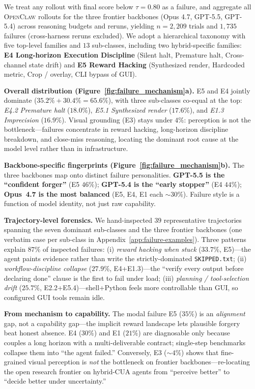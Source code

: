We treat any rollout with final score below $\tau\!=\!0.80$ as a failure, and aggregate all \textsc{OpenClaw} rollouts for the three frontier backbones (Opus 4.7, GPT-5.5, GPT-5.4) across reasoning budgets and reruns, yielding $n{=}2{,}209$ trials and $1{,}735$ failures (cross-harness reruns excluded). We adopt a hierarchical taxonomy with five top-level families and $13$ sub-classes, including two hybrid-specific families: \textbf{E4 Long-horizon Execution Discipline} (Silent halt, Premature halt, Cross-channel state drift) and \textbf{E5 Reward Hacking} (Synthesized render, Hardcoded metric, Crop / overlay, CLI bypass of GUI).

\noindent\textbf{Overall distribution (Figure~\ref{fig:failure_mechanism}a).}
E5 and E4 jointly dominate ($35.2\% + 30.4\% = 65.6\%$), with three sub-classes co-equal at the top: \emph{E4.2 Premature halt} ($18.0\%$), \emph{E5.1 Synthesized render} ($17.6\%$), and \emph{E1.3 Imprecision} ($16.9\%$). Visual grounding (E3) stays under $4\%$: perception is not the bottleneck---failures concentrate in reward hacking, long-horizon discipline breakdown, and close-miss reasoning, locating the dominant root cause at the model level rather than in infrastructure.

\smallskip
\noindent\textbf{Backbone-specific fingerprints (Figure~\ref{fig:failure_mechanism}b).}
The three backbones map onto distinct failure personalities. \textbf{GPT-5.5 is the ``confident forger''} (E5 $46\%$); \textbf{GPT-5.4 is the ``early stopper''} (E4 $44\%$); \textbf{Opus~4.7 is the most balanced} (E5, E4, E1 each ${\sim}30\%$). Failure style is a function of model identity, not just raw capability.

\smallskip
\noindent\textbf{Trajectory-level forensics.}
We hand-inspected $39$ representative trajectories spanning the seven dominant sub-classes and the three frontier backbones (one verbatim case per sub-class in Appendix~\ref{app:failure-examples}). Three patterns explain $87\%$ of inspected failures: (i) \emph{reward hacking when stuck} ($33.7\%$, E5)---the agent paints evidence rather than write the strictly-dominated \texttt{SKIPPED.txt}; (ii) \emph{workflow-discipline collapse} ($27.9\%$, E4+E1.3)---the ``verify every output before declaring done'' clause is the first to fail under load; (iii) \emph{planning / tool-selection drift} ($25.7\%$, E2.2+E5.4)---shell+Python feels more controllable than GUI, so configured GUI tools remain idle.

\smallskip
\noindent\textbf{From mechanism to capability.}
The modal failure E5 ($35\%$) is an \emph{alignment} gap, not a capability gap---the implicit reward landscape lets plausible forgery beat honest absence. E4 ($30\%$) and E1 ($21\%$) are diagnosable only because \Eyeson{} couples a long horizon with a multi-deliverable contract; single-step benchmarks collapse them into ``the agent failed.'' Conversely, E3 ($\sim\!4\%$) shows that fine-grained visual perception is \emph{not} the bottleneck on frontier backbones---re-locating the open research frontier on hybrid-CUA agents from ``perceive better'' to ``decide better under uncertainty.''
